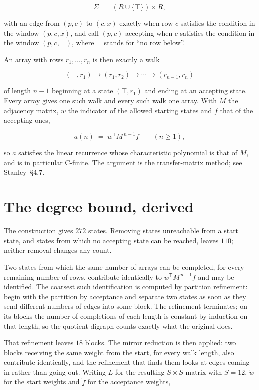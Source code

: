 \documentclass[11pt]{article}
\theoremstyle{definition}
\begin{document}
\[\Sigma \;=\; (R \cup \{\top\}) \times R,\]

with an edge from $(p,c)$ to $(c,x)$ exactly when row $c$ satisfies the condition in the window $(p,c,x)$, and call $(p,c)$ accepting when $c$ satisfies the condition in the window $(p,c,\bot)$, where $\bot$ stands for ``no row below''.

An array with rows $r_1,\dots,r_n$ is then exactly a walk

\[(\top,r_1) \to (r_1,r_2) \to \cdots \to (r_{n-1},r_n)\]

of length $n-1$ beginning at a state $(\top,r_1)$ and ending at an accepting state. Every array gives one such walk and every such walk one array. With $M$ the adjacency matrix, $w$ the indicator of the allowed starting states and $f$ that of the accepting ones,

\[a(n) \;=\; w^{\mathsf T} M^{\,n-1} f \qquad (n \ge 1),\]

so $a$ satisfies the linear recurrence whose characteristic polynomial is that of $M$, and is in particular C-finite. The argument is the transfer-matrix method; see Stanley~\S4.7.

\section{The degree bound, derived}

The construction gives $272$ states. Removing states unreachable from a start state, and states from which no accepting state can be reached, leaves $110$; neither removal changes any count.

Two states from which the same number of arrays can be completed, for every remaining number of rows, contribute identically to $w^{\mathsf T}M^{\,n-1}f$ and may be identified. The coarsest such identification is computed by partition refinement: begin with the partition by acceptance and separate two states as soon as they send different numbers of edges into some block. The refinement terminates; on its blocks the number of completions of each length is constant by induction on that length, so the quotient digraph counts exactly what the original does.

That refinement leaves $18$ blocks. The mirror reduction is then applied: two blocks receiving the same weight from the start, for every walk length, also contribute identically, and the refinement that finds them looks at edges coming in rather than going out. Writing $L$ for the resulting $S \times S$ matrix with $S = 12$, $\tilde w$ for the start weights and $\tilde f$ for the acceptance weights,
\end{document}
